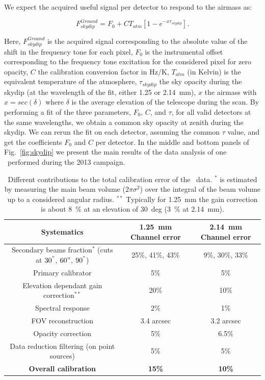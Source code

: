We expect the acquired useful signal per detector to respond to the airmass as:

\begin{equation}\label{eq:skydip}
F^{Ground}_{skydip} = F_0 + C T_{atm}[1 - e^{- x \tau_{skydip}}].
\end{equation}

Here, $F^{Ground}_{skydip}$ is the acquired signal corresponding to the
absolute value of the shift in the frequency tone for each pixel, $F_0$ is the
instrumental offset corresponding to the frequency tone excitation for the
considered pixel for zero opacity, $C$ the calibration conversion factor in
$\mathrm{Hz/K}$, $T_{atm}$ (in Kelvin) is the equivalent temperature of the
atmosphere, $\tau_{skydip}$ the sky opacity during the skydip (at the
wavelength of the fit, either 1.25 or 2.14~mm), $x$ the airmass 
with $x = sec(\delta)$  where $\delta$ is the average elevation
of the telescope during the scan. By performing a fit of the three
parameters, $F_0$, $C$, and $\tau$, for all valid detectors at the same
wavelengths, we obtain a common sky opacity at zenith during the skydip. We
can rerun the fit on each detector, assuming the common $\tau$ value, and get
the coefficients $F_0$ and $C$ per detector. In the middle and bottom panels of Fig.~\ref{fig:skydip} we
present the main results of the data analysis of one \Skydip\ performed during the
2013 campaign.

\begin{table}
\begin{center}
\begin{tabular}{ccc}
\hline
\hline
Systematics & 1.25~mm Channel error &  2.14~mm Channel error  \\
\hline \hline
Secondary beams fraction$^*$  (cuts at $30^{"}$, $60{"}$, $90^{"}$) & 25\%, 41\%, 43\%   & 9\%, 30\%, 33\% \\
Primary calibrator &  5\% & 5\% \\
Elevation dependant gain correction$^{**}$ &  20\% & 10\% \\
Spectral response &  2\% & 1\% \\
FOV reconstruction & 3.4 arcsec & 3.2 arcsec \\
Opacity correction &  5\% & 6.5\%  \\
Data reduction filtering (on point sources)  &  5\% & 5\%  \\
\hline
\bfseries{Overall calibration}  & \bfseries{15\%} & \bfseries{10\%} \\
\hline \hline
\end{tabular}
\end{center}
\caption{Different contributions to the total calibration error of the \NIKA\ data. $^*$  is estimated by measuring the main beam volume ($2\pi \sigma^2$) over the integral of the beam volume up to a considered angular radius. $^{**}$ Typically for 1.25~mm the gain correction is about 8~\% at an elevation of 30~deg (3~\% at 2.14~mm).}
\label{tab:table_err}
\end{table}


